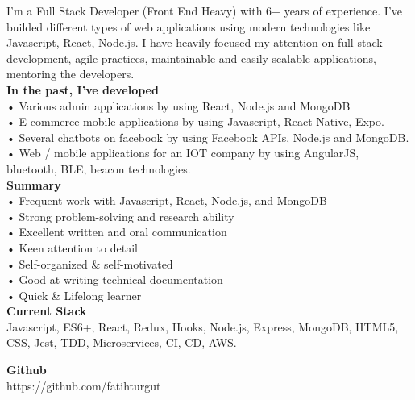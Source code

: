 

\begin{cvparagraph}

I'm a Full Stack Developer (Front End Heavy) with 6+ years of experience. I've builded different types of web applications using modern technologies like Javascript, React, Node.js. I have heavily focused my attention on full-stack development, agile practices, maintainable and easily scalable applications, mentoring the developers. \\

\textbf {In the past, I've developed} \\
• Various admin applications by using React, Node.js and MongoDB \\
• E-commerce mobile applications by using Javascript, React Native, Expo. \\
• Several chatbots on facebook by using Facebook APIs, Node.js and MongoDB. \\
• Web / mobile applications for an IOT company by using AngularJS, bluetooth, BLE, beacon technologies. \\

\textbf {Summary} \\
• Frequent work with Javascript, React, Node.js, and MongoDB \\
• Strong problem-solving and research ability \\
• Excellent written and oral communication \\
• Keen attention to detail \\
• Self-organized {\&} self-motivated \\
• Good at writing technical documentation \\
• Quick {\&} Lifelong learner \\


\textbf {Current Stack} \\
Javascript, ES6+, React, Redux, Hooks, Node.js, Express, MongoDB, HTML5, CSS, Jest, TDD, Microservices, CI, CD, AWS.

\textbf {Github} \\
https://github.com/fatihturgut

\end{cvparagraph}
